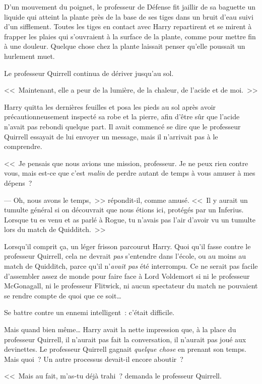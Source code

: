 D'un mouvement du poignet, le professeur de Défense fit jaillir de sa baguette un liquide qui atteint la plante près de la base de ses tiges dans un bruit d'eau suivi d'un sifflement. Toutes les tiges en contact avec Harry repartirent et se mirent à frapper les plaies qui s'ouvraient à la surface de la plante, comme pour mettre fin à une douleur. Quelque chose chez la plante laissait penser qu'elle poussait un hurlement muet.

Le professeur Quirrell continua de dériver jusqu'au sol.

<<~Maintenant, elle a peur de la lumière, de la chaleur, de l'acide et de moi.~>>

Harry quitta les dernières feuilles et posa les pieds au sol après avoir précautionneusement inspecté sa robe et la pierre, afin d'être sûr que l'acide n'avait pas rebondi quelque part. Il avait commencé se dire que le professeur Quirrell essayait de lui envoyer un message, mais il n'arrivait pas à le comprendre.

<<~Je pensais que nous avions une mission, professeur. Je ne peux rien contre vous, mais est-ce que c'est \emph{malin} de perdre autant de temps à vous amuser à mes dépens~?

--- Oh, nous avons le temps,~>> répondit-il, comme amusé. <<~Il y aurait un tumulte général si on découvrait que nous étions ici, protégés par un Inferius. Lorsque tu es venu et as parlé à Rogue, tu n'avais pas l'air d'avoir vu un tumulte lors du match de Quidditch.~>>

Lorsqu'il comprit ça, un léger frisson parcourut Harry. Quoi qu'il fasse contre le professeur Quirrell, cela ne devrait \emph{pas} s'entendre dans l'école, ou au moins au match de Quidditch, parce qu'il n'\emph{avait pas} été interrompu. Ce ne serait pas facile d'assembler assez de monde pour faire face à Lord Voldemort si ni le professeur McGonagall, ni le professeur Flitwick, ni aucun spectateur du match ne pouvaient se rendre compte de quoi que ce soit…

Se battre contre un ennemi intelligent~: c'était difficile.

Mais quand bien même… Harry avait la nette impression que, à la place du professeur Quirrell, il n'aurait pas fait la conversation, il n'aurait pas joué aux devinettes. Le professeur Quirrell gagnait \emph{quelque chose} en prenant son temps. Mais quoi~? Un autre processus devait-il encore aboutir~?

<<~Mais au fait, m'as-tu déjà trahi~? demanda le professeur Quirrell.

